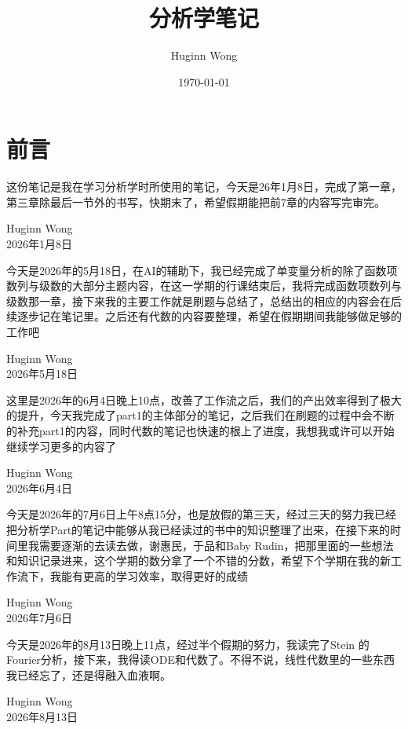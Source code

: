 \documentclass{book}
\title{分析学笔记}
\author{Huginn Wong}
\date{\today}
\begin{document}
\makecover
	
	\frontmatter
	
	\chapter*{前言}
	
	这份笔记是我在学习分析学时所使用的笔记，今天是26年1月8日，完成了第一章，第三章除最后一节外的书写，快期末了，希望假期能把前7章的内容写完审完。
	
	\vspace{1cm}
	\begin{flushright}
		Huginn Wong\\
		2026年1月8日
	\end{flushright}
	
	今天是2026年的5月18日，在AI的辅助下，我已经完成了单变量分析的除了函数项数列与级数的大部分主题内容，在这一学期的行课结束后，我将完成函数项数列与级数那一章，接下来我的主要工作就是刷题与总结了，总结出的相应的内容会在后续逐步记在笔记里。之后还有代数的内容要整理，希望在假期期间我能够做足够的工作吧
		\vspace{1cm}
	\begin{flushright}
		Huginn Wong\\
		2026年5月18日
	\end{flushright}
	
	这里是2026年的6月4日晚上10点，改善了工作流之后，我们的产出效率得到了极大的提升，今天我完成了part1的主体部分的笔记，之后我们在刷题的过程中会不断的补充part1的内容，同时代数的笔记也快速的根上了进度，我想我或许可以开始继续学习更多的内容了
	\begin{flushright}
		Huginn Wong\\
		2026年6月4日
	\end{flushright}
	
	今天是2026年的7月6日上午8点15分，也是放假的第三天，经过三天的努力我已经把分析学Part的笔记中能够从我已经读过的书中的知识整理了出来，在接下来的时间里我需要逐渐的去读去做，谢惠民，于品和Baby Rudin，把那里面的一些想法和知识记录进来，这个学期的数分拿了一个不错的分数，希望下个学期在我的新工作流下，我能有更高的学习效率，取得更好的成绩
	\begin{flushright}
		Huginn Wong\\
		2026年7月6日
	\end{flushright}
	\newpage
	今天是2026年的8月13日晚上11点，经过半个假期的努力，我读完了Stein 的Fourier分析，接下来，我得读ODE和代数了。不得不说，线性代数里的一些东西我已经忘了，还是得融入血液啊。
	\begin{flushright}
		Huginn Wong\\
		2026年8月13日
	\end{flushright}
	\tableofcontents
	\newpage
	
\end{document}
